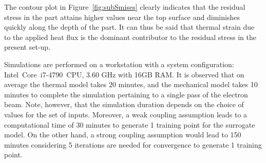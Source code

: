 %
The contour plot in Figure~\ref{fig:subSmises} clearly indicates that the residual stress in the part attains higher
values near the top surface and diminishes quickly along the depth of the part. It can thus be said that thermal
strain due to the applied heat flux is the dominant contributor to the residual stress in the present set-up. 

Simulations are performed on a workstation with a system configuration: Intel~Core~i7-4790~CPU, 
3.60 GHz with 16GB RAM. It is observed that on average the thermal model takes 20 minutes, and the
mechanical model takes 10 minutes to complete the simulation pertaining to a single pass of the
electron beam. Note, however, that the simulation duration depends on the choice of
values for the set of inputs. Moreover, a weak coupling assumption leads to a computational time of 30
minutes to generate 1 training point for the surrogate model. On the other hand, a strong coupling assumption 
would lead to 150 minutes considering 5 iterations are needed for convergence to generate 1 training point. 

























